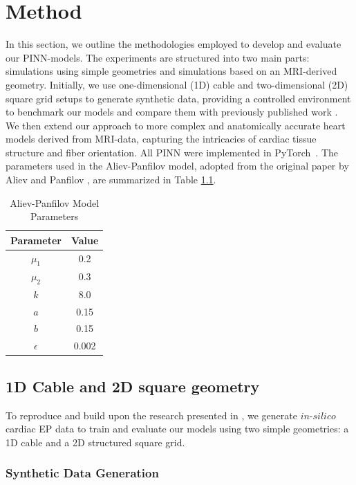 \chapter{Method}
In this section, we outline the methodologies employed to develop and evaluate our PINN-models. The experiments are structured into two main parts: simulations using simple geometries and simulations based on an MRI-derived geometry. Initially, we use one-dimensional (1D) cable and two-dimensional (2D) square grid setups to generate synthetic data, providing a controlled environment to benchmark our models and compare them with previously published work \cite{EP-PINNs}. We then extend our approach to more complex and anatomically accurate heart models derived from MRI-data, capturing the intricacies of cardiac tissue structure and fiber orientation. All PINN were implemented in PyTorch~\cite{pytorch}.
The parameters used in the Aliev-Panfilov model, adopted from the original paper by Aliev and Panfilov \cite{R-D-PANFILOV20191}, are summarized in Table \ref{tab:aliev-panfilov-parameters}.

\begin{table}[h!]
    \centering
    \caption{Aliev-Panfilov Model Parameters}
    \begin{tabular}{|c|c|}
        \hline
        \textbf{Parameter} & \textbf{Value} \\
        \hline
        $\mu_1$ & 0.2 \\
        $\mu_2$ & 0.3 \\
        $k$ & 8.0 \\
        $a$ & 0.15 \\
        $b$ & 0.15 \\
        $\epsilon$ & 0.002 \\
        \hline
    \end{tabular}
    \label{tab:aliev-panfilov-parameters}
\end{table}

\section{1D Cable and 2D square geometry}\label{data_structured}
To reproduce and build upon the research presented in \cite{EP-PINNs}, we generate $\textit{in-silico}$ cardiac EP data to train and evaluate our models using two simple geometries: a 1D cable and a 2D structured square grid. 
\subsection{Synthetic Data Generation}

